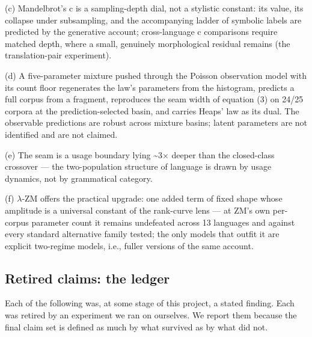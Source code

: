 \documentclass[11pt]{article}
\begin{document}
(c) Mandelbrot's c is a sampling-depth dial, not a stylistic constant: its value, its collapse under subsampling, and the accompanying ladder of symbolic labels are predicted by the generative account; cross-language c comparisons require matched depth, where a small, genuinely morphological residual remains (the translation-pair experiment).

(d) A five-parameter mixture pushed through the Poisson observation model with its count floor regenerates the law's parameters from the histogram, predicts a full corpus from a fragment, reproduces the seam width of equation (3) on 24/25 corpora at the prediction-selected basin, and carries Heaps' law as its dual. The observable predictions are robust across mixture basins; latent parameters are not identified and are not claimed.

(e) The seam is a usage boundary lying \~{}3$\times$ deeper than the closed-class crossover --- the two-population structure of language is drawn by usage dynamics, not by grammatical category.

(f) $\lambda$-ZM offers the practical upgrade: one added term of fixed shape whose amplitude is a universal constant of the rank-curve lens --- at ZM's own per-corpus parameter count it remains undefeated across 13 languages and against every standard alternative family tested; the only models that outfit it are explicit two-regime models, i.e., fuller versions of the same account.

\subsection{Retired claims: the ledger}
Each of the following was, at some stage of this project, a stated finding. Each was retired by an experiment we ran on ourselves. We report them because the final claim set is defined as much by what survived as by what did not.
\end{document}

